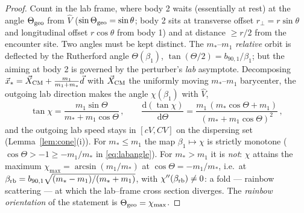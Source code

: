 \documentclass[11pt]{article}
\newcommand{\dd}{\mathrm{d}}
\newcommand{\rp}{r_\perp}
\newcommand{\Vh}{\hat V}
\begin{document}
\begin{proof}
Count in the lab frame, where body 2 waits (essentially at rest) at the angle $\Theta_{\rm geo}$
from $\Vh$ ($\sin\Theta_{\rm geo}=\sin\theta$; body 2 sits at transverse offset $\rp=r\sin\theta$
and longitudinal offset $r\cos\theta$ from body 1) and at distance $\ge r/2$ from the encounter
site. Two angles must be kept distinct. The $m_*$--$m_1$ \emph{relative} orbit is deflected by the
Rutherford angle $\Theta(\beta_1)$, $\tan(\Theta/2)=b_{90,1}/\beta_1$; but the aiming at body 2 is
governed by the perturber's \emph{lab} asymptote. Decomposing
$\vec x_*=\vec X_{\rm CM}+\frac{m_1}{m_1+m_*}\vec d$ with $\vec X_{\rm CM}$ the uniformly moving
$m_*$--$m_1$ barycenter, the outgoing lab direction makes the angle $\chi(\beta_1)$ with $\Vh$,
\begin{equation}
  \tan\chi=\frac{m_1\sin\Theta}{m_*+m_1\cos\Theta}\,,
  \qquad
  \frac{\dd(\tan\chi)}{\dd\Theta}=\frac{m_1\,(m_*\cos\Theta+m_1)}{(m_*+m_1\cos\Theta)^2}\,,
  \label{eq:labangle}
\end{equation}
and the outgoing lab speed stays in $[cV,CV]$ on the dispersing set (Lemma~\ref{lem:cone}(i)). For
$m_*\le m_1$ the map $\beta_1\mapsto\chi$ is strictly monotone ($\cos\Theta>-1\ge-m_1/m_*$ in
\eqref{eq:labangle}). For $m_*>m_1$ it is \emph{not}: $\chi$ attains the maximum
$\chi_{\max}=\arcsin(m_1/m_*)$ at $\cos\Theta=-m_1/m_*$, i.e.\ at
$\beta_{\rm rb}=b_{90,1}\sqrt{(m_*-m_1)/(m_*+m_1)}$, with $\chi''(\beta_{\rm rb})\neq0$: a fold
--- rainbow scattering --- at which the lab--frame cross section diverges. The \emph{rainbow
orientation} of the statement is $\Theta_{\rm geo}=\chi_{\max}$.


\end{proof}
\end{document}
